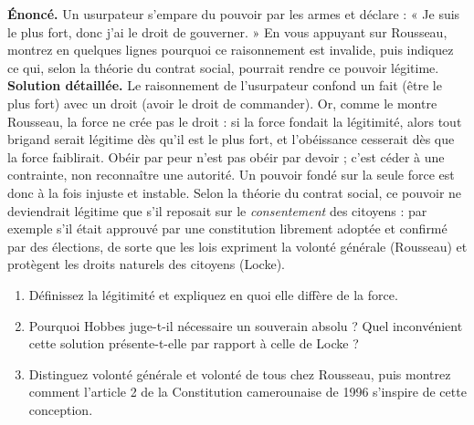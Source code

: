 \documentclass[11pt]{article}
\begin{document}
\begin{exoresolu}
\textbf{Énoncé.} Un usurpateur s'empare du pouvoir par les armes et déclare : « Je suis le plus fort, donc j'ai le droit de gouverner. » En vous appuyant sur Rousseau, montrez en quelques lignes pourquoi ce raisonnement est invalide, puis indiquez ce qui, selon la théorie du contrat social, pourrait rendre ce pouvoir légitime.
\tcblower
\textbf{Solution détaillée.} Le raisonnement de l'usurpateur confond un fait (être le plus fort) avec un droit (avoir le droit de commander). Or, comme le montre Rousseau, la force ne crée pas le droit : si la force fondait la légitimité, alors tout brigand serait légitime dès qu'il est le plus fort, et l'obéissance cesserait dès que la force faiblirait. Obéir par peur n'est pas obéir par devoir ; c'est céder à une contrainte, non reconnaître une autorité. Un pouvoir fondé sur la seule force est donc à la fois injuste et instable. Selon la théorie du contrat social, ce pouvoir ne deviendrait légitime que s'il reposait sur le \emph{consentement} des citoyens : par exemple s'il était approuvé par une constitution librement adoptée et confirmé par des élections, de sorte que les lois expriment la volonté générale (Rousseau) et protègent les droits naturels des citoyens (Locke).
\end{exoresolu}

\begin{exercice}
\begin{enumerate}
\item Définissez la légitimité et expliquez en quoi elle diffère de la force.
\item Pourquoi Hobbes juge-t-il nécessaire un souverain absolu ? Quel inconvénient cette solution présente-t-elle par rapport à celle de Locke ?
\item Distinguez volonté générale et volonté de tous chez Rousseau, puis montrez comment l'article 2 de la Constitution camerounaise de 1996 s'inspire de cette conception.
\end{enumerate}
\end{exercice}
\end{document}
